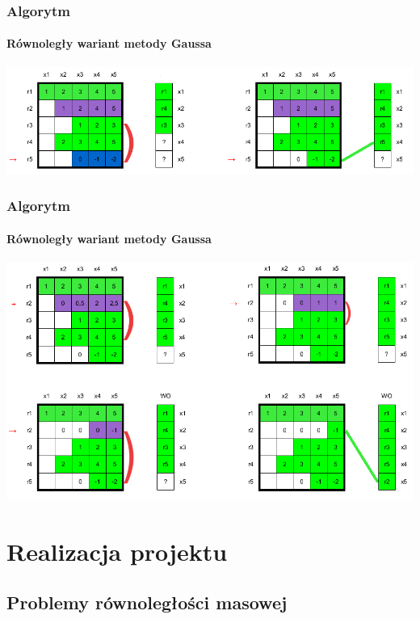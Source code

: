 \documentclass[12pt,handout]{beamer}
\begin{document}
\begin{frame}
\frametitle{Algorytm}
\framesubtitle{Równoległy wariant metody Gaussa}
\hfill\includegraphics[scale=0.45]{faza2a_conflictResolution.png}\hspace*{\fill}
\end{frame}

\begin{frame}
\frametitle{Algorytm}
\framesubtitle{Równoległy wariant metody Gaussa}
\hfill\includegraphics[scale=0.45]{faza2b_conflictResolution.png}\hspace*{\fill}
\end{frame}

\section{Realizacja projektu}
\subsection{Problemy równoległości masowej}
\end{document}
